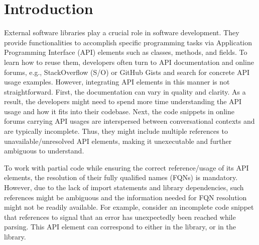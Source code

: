 \section{Introduction}
\label{sec:intro}
External software libraries play a crucial role in software development. They provide functionalities to accomplish specific programming tasks via Application Programming Interface (API) elements such as classes, methods, and fields. To learn how to reuse them, developers often turn to API documentation and online forums, e.g., StackOverflow (S/O) or GitHub Gists and search for concrete API usage examples. However, integrating API elements in this manner is not straightforward. First, the documentation can vary in quality and clarity. As a result, the developers might need to spend more time understanding the API usage and how it fits into their codebase. Next, the code snippets in online forums carrying API usages are interspersed between conversational contexts and are typically incomplete. Thus, they might include multiple references to unavailable/unresolved API elements, making it unexecutable and further ambiguous to understand.

To work with partial code while ensuring the correct reference/usage of its API elements, the resolution of their fully qualified names (FQNs) is mandatory. However, due to the lack of import statements and library dependencies, such references might be ambiguous and the information needed for FQN resolution might not be readily available. For example, consider an incomplete code snippet that references  to signal that an error has unexpectedly been reached while parsing. This API element can correspond to either  in the  library, or  in the  library. 

